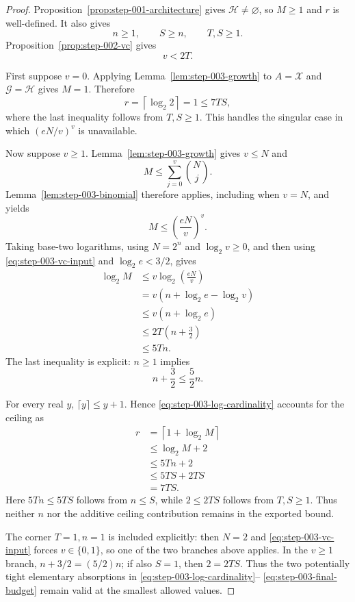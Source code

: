 \begin{proof}
Proposition~\ref{prop:step-001-architecture} gives
$\mathcal H\neq\varnothing$, so $M\geq1$ and $r$ is well-defined.  It also
gives
\begin{equation}
n\geq1,\qquad S\geq n,\qquad T,S\geq1.
\label{eq:step-003-structural-inputs}
\end{equation}
Proposition~\ref{prop:step-002-vc} gives
\begin{equation}
v<2T.
\label{eq:step-003-vc-input}
\end{equation}

First suppose $v=0$.  Applying Lemma~\ref{lem:step-003-growth} to
$A=\mathcal X$ and $\mathcal G=\mathcal H$ gives $M=1$.  Therefore
\[
r=\left\lceil\log_2 2\right\rceil=1\leq7TS,
\]
where the last inequality follows from $T,S\geq1$.  This handles the
singular case in which $(eN/v)^v$ is unavailable.

Now suppose $v\geq1$.  Lemma~\ref{lem:step-003-growth} gives $v\leq N$ and
\[
M\leq\sum_{j=0}^{v}\binom Nj.
\]
Lemma~\ref{lem:step-003-binomial} therefore applies, including when $v=N$,
and yields
\[
M\leq\left(\frac{eN}{v}\right)^v.
\]
Taking base-two logarithms, using $N=2^n$ and $\log_2v\geq0$, and then
using \eqref{eq:step-003-vc-input} and $\log_2e<3/2$, gives
\begin{equation}
\begin{aligned}
\log_2M
&\leq v\log_2\!\left(\frac{eN}{v}\right)\\
&=v\left(n+\log_2e-\log_2v\right)\\
&\leq v\left(n+\log_2e\right)\\
&\leq2T\left(n+\frac32\right)\\
&\leq5Tn.
\end{aligned}
\label{eq:step-003-log-cardinality}
\end{equation}
The last inequality is explicit: $n\geq1$ implies
\[
n+\frac32\leq\frac52n.
\]

For every real $y$, $\lceil y\rceil\leq y+1$.  Hence
\eqref{eq:step-003-log-cardinality} accounts for the ceiling as
\begin{equation}
\begin{aligned}
r
&=\left\lceil1+\log_2M\right\rceil\\
&\leq\log_2M+2\\
&\leq5Tn+2\\
&\leq5TS+2TS\\
&=7TS.
\end{aligned}
\label{eq:step-003-final-budget}
\end{equation}
Here $5Tn\leq5TS$ follows from $n\leq S$, while $2\leq2TS$ follows from
$T,S\geq1$.  Thus neither $n$ nor the additive ceiling contribution remains
in the exported bound.

The corner $T=1,n=1$ is included explicitly: then $N=2$ and
\eqref{eq:step-003-vc-input} forces $v\in\{0,1\}$, so one of the two branches
above applies.  In the $v\geq1$ branch,
$n+3/2=(5/2)n$; if also $S=1$, then $2=2TS$.  Thus the two potentially
tight elementary absorptions in \eqref{eq:step-003-log-cardinality}--
\eqref{eq:step-003-final-budget} remain valid at the smallest allowed values.
\end{proof}

